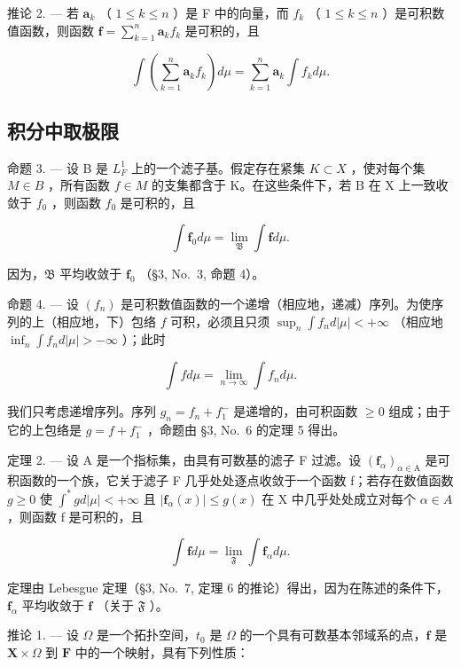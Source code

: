 推论 2. --- 若 \(\mathbf{a}_k\) （ \(1 \leqslant k \leqslant n\) ）是 F 中的向量，而 \(f_k\) （ \(1 \leqslant k \leqslant n\) ）是可积数值函数，则函数 \(\mathbf{f} = \sum_{k=1}^{n} \mathbf{a}_k f_k\) 是可积的，且

\[
\int \left(\sum_ {k = 1} ^ {n} \mathbf {a} _ {k} f _ {k}\right) d \mu = \sum_ {k = 1} ^ {n} \mathbf {a} _ {k} \int f _ {k} d \mu .\tag{8}
\]

\subsection{积分中取极限}

命题 3. --- 设 B 是 \(L_{F}^{1}\) 上的一个滤子基。假定存在紧集 \(K \subset X\) ，使对每个集 \(M \in B\) ，所有函数 \(f \in M\) 的支集都含于 K。在这些条件下，若 B 在 X 上一致收敛于 \(f_{0}\) ，则函数 \(f_{0}\) 是可积的，且

\[
\int \mathbf {f} _ {0} d \mu = \lim _ {\mathfrak {B}} \int \mathbf {f} d \mu .\tag{9}
\]

因为，\(\mathfrak{B}\) 平均收敛于 \(\mathbf{f}_0\) （§3, No.~3, 命题 4）。

命题 4. --- 设 \((f_n)\) 是可积数值函数的一个递增（相应地，递减）序列。为使序列的上（相应地，下）包络 \(f\) 可积，必须且只须 \(\sup_{n} \int f_n d|\mu| < +\infty\) （相应地 \(\inf_{n} \int f_n d|\mu| > -\infty\) ）；此时

\[
\int f d \mu = \lim _ {n \to \infty} \int f _ {n} d \mu .\tag{10}
\]

我们只考虑递增序列。序列 \(g_{n} = f_{n} + f_{1}^{-}\) 是递增的，由可积函数 \(\geqslant 0\) 组成；由于它的上包络是 \(g = f + f_{1}^{-}\) ，命题由 §3, No.~6 的定理 5 得出。

定理 2. --- 设 A 是一个指标集，由具有可数基的滤子 F 过滤。设 \((\mathbf{f}_{\alpha})_{\alpha\in\mathrm{A}}\) 是可积函数的一个族，它关于滤子 F 几乎处处逐点收敛于一个函数 f；若存在数值函数 \(g\geqslant0\) 使 \(\int^{*}gd|\mu|<+\infty\) 且 \(|\mathbf{f}_{\alpha}(x)|\leqslant g(x)\) 在 X 中几乎处处成立对每个 \(\alpha\in A\) ，则函数 f 是可积的，且

\[
\int \mathbf {f} d \mu = \lim _ {\mathfrak {F}} \int \mathbf {f} _ {\alpha} d \mu .\tag{11}
\]

定理由 Lebesgue 定理（§3, No.~7, 定理 6 的推论）得出，因为在陈述的条件下，\(\mathbf{f}_{\alpha}\) 平均收敛于 \(\mathbf{f}\) （关于 \(\mathfrak{F}\) ）。

推论 1. --- 设 \(\Omega\) 是一个拓扑空间，\(t_0\) 是 \(\Omega\) 的一个具有可数基本邻域系的点，\(\mathbf{f}\) 是 \(\mathbf{X} \times \Omega\) 到 \(\mathbf{F}\) 中的一个映射，具有下列性质：

